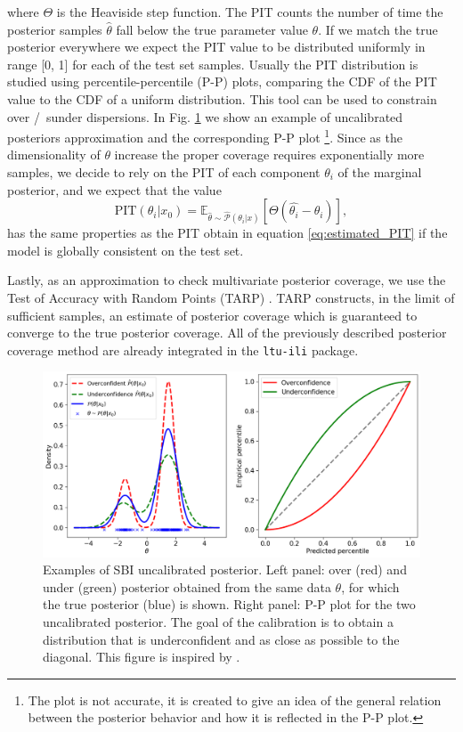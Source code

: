 where $\Theta$ is the Heaviside step function. The PIT counts the number of time the posterior samples $\hat{\theta}$ fall below the true parameter value $\theta$.  If we match the true posterior everywhere we expect the PIT value to be distributed uniformly in range [0, 1] for each of the test set samples. Usually the PIT distribution is studied using percentile-percentile (P-P) plots, comparing the CDF of the PIT value to the CDF of a uniform distribution. This tool can be used to constrain over /\ sunder dispersions. In Fig. \ref{fig:calibration} we show an example of uncalibrated posteriors approximation and the corresponding P-P plot \footnote{The plot is not accurate, it is created to give an idea of the general relation between the posterior behavior and how it is reflected in the P-P plot.}. Since as the dimensionality of $\theta$ increase the proper coverage requires exponentially more samples, we decide to rely on the PIT of each component $\theta_i$ of the marginal posterior, and we expect that the value
\begin{equation}
    \text{PIT}(\theta_i|x_0) = \mathbb{E}_{\hat{\theta}\sim \hat{\mathcal{P}}(\theta_i|x)}[\Theta (\hat{\theta_i} - \theta_i)],  
\label{eq:estimated_marginal_PIT}
\end{equation}
has the same properties as the PIT obtain in equation \ref{eq:estimated_PIT} if the model is globally consistent on the test set.

Lastly, as an approximation to check multivariate posterior coverage, we use the Test of Accuracy with Random Points (TARP) \cite{lemosSamplingBasedAccuracyTesting}. TARP constructs, in the limit of sufficient samples, an estimate of posterior coverage which is guaranteed to converge to the true posterior coverage. 
All of the previously  described posterior coverage method are already integrated in the \texttt{ltu-ili} package. 
\begin{figure}[ht]
    \centering
    \includegraphics[width=1\textwidth]{./figure/calibration.png}
    \caption{Examples of SBI uncalibrated posterior. Left panel: over (red) and under (green) posterior obtained from the same data $\theta$, for which the true posterior (blue) is shown. Right panel: P-P plot for the two uncalibrated posterior. The goal of the calibration is to obtain a distribution that is underconfident and as close as possible to the diagonal. This figure is inspired by \cite{falkiewiczCalibratingNeuralSimulationBased}. }
    \label{fig:calibration}
\end{figure}

